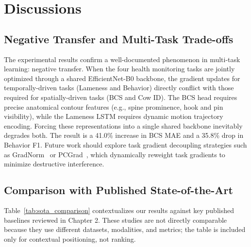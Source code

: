 \section{Discussions}

\subsection{Negative Transfer and Multi-Task Trade-offs}
The experimental results confirm a well-documented phenomenon in multi-task learning: negative transfer. When the four health monitoring tasks are jointly optimized through a shared EfficientNet-B0 backbone, the gradient updates for temporally-driven tasks (Lameness and Behavior) directly conflict with those required for spatially-driven tasks (BCS and Cow ID). The BCS head requires precise anatomical contour features (e.g., spine prominence, hook and pin visibility), while the Lameness LSTM requires dynamic motion trajectory encoding. Forcing these representations into a single shared backbone inevitably degrades both. The result is a 41.0\% increase in BCS MAE and a 35.8\% drop in Behavior F1. Future work should explore task gradient decoupling strategies such as GradNorm~\cite{chen2018gradnorm} or PCGrad~\cite{yu2020pcgrad}, which dynamically reweight task gradients to minimize destructive interference.

\subsection{Comparison with Published State-of-the-Art}
Table~\ref{tab:sota_comparison} contextualizes our results against key published baselines reviewed in Chapter 2. These studies are not directly comparable because they use different datasets, modalities, and metrics; the table is included only for contextual positioning, not ranking.

\begin{table}[H]
\centering
\caption{Contextual comparison with published studies using non-equivalent datasets, metrics, and modalities.}
\label{tab:sota_comparison}
\caption*{* Note: These studies are not directly comparable because they use different datasets, modalities, and metrics; the table is included only for contextual positioning, not ranking. Post-hoc perfect separation is excluded due to test-set leakage.}
\end{table}

